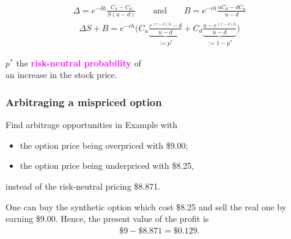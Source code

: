 \begin{frame}[fragile,t]
\begin{align*}
	\Delta = e^{-\delta h}	\frac{C_h-C_d}{S(u-d)} \qquad \text{and} \qquad
	B = e^{-r h}	\frac{uC_d-dC_u}{u-d}
\end{align*}
\bigskip
\begin{align*}
	\Delta S + B = e^{-rh}\bigg(C_u \underbrace{\frac{e^{(r-\delta)h}-d}{u-d}}_{:=p^*} + C_d \underbrace{\frac{u-e^{(r-\delta) h}}{u-d}}_{:=1-p^*}\bigg)
\end{align*}
\bigskip
\begin{center}
	$p^*$ the \textcolor{magenta}{\bf risk-neutral probability} of \\
	an increase in the stock price.
\end{center}
\end{frame}
\begin{frame}[fragile,t]
	\frametitle{Arbitraging a mispriced option}
	\begin{myexample}
		Find arbitrage opportunities in Example  with
		\begin{itemize}
			\item the option price being overpriced with \$9.00;
			\item the option price being underpriced with \$8.25,
		\end{itemize}
		\pause
		instead of the risk-neutral pricing \$8.871.
	\end{myexample}
	\bigskip
	\pause
	\begin{mysol}
		One can buy the synthetic option which cost \$8.25 and sell the real one by earning \$9.00.
		Hence, the present value of the profit is
		\begin{align*}
			\$ 9 - \$ 8.871 = \$ 0.129.
		\end{align*}
		\myEnd
	\end{mysol}
\end{frame}

